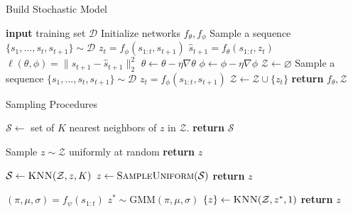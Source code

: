 \documentclass{article}
\begin{document}
\begin{minipage}[t]{7cm}
  \vspace{0pt}

  \begin{algorithm}[H]
    \caption{Build Stochastic Model}
  \begin{algorithmic}[1]
    \State \textbf{input} training set $\mathcal{D}$
    \State Initialize networks $f_\theta, f_\phi$
    \State Sample a sequence $\{s_1, ..., s_t, s_{t+1}\} \sim \mathcal{D}$
    \State $z_t = f_{\phi}(s_{1:t}, s_{t+1})$
    \State $\hat{s}_{t+1} = f_{\theta}(s_{1:t}, z_t)$
    \State $\ell(\theta, \phi) = \|s_{t+1} - \hat{s}_{t+1} \|_2^2$
    \State $\theta \leftarrow \theta - \eta \nabla \theta$
    \State $\phi \leftarrow \phi - \eta \nabla \phi$
    \EndWhile
    \State $\mathcal{Z} \leftarrow \varnothing$
    \State Sample a sequence $\{s_1, ..., s_t, s_{t+1}\} \sim \mathcal{D}$
    \State $z_t = f_{\phi}(s_{1:t}, s_{t+1})$
    \State $\mathcal{Z} \leftarrow \mathcal{Z} \cup \{ z_t \}$
    \EndFor
    \State \textbf{return} $f_\theta, \mathcal{Z}$
  \end{algorithmic}
  \end{algorithm}
\end{minipage}%
\begin{minipage}[t]{7cm}
  \vspace{0pt}

\begin{algorithm}[H]
  \caption{Sampling Procedures}\label{algo-sample}
  \begin{algorithmic}[1]
    \State $\mathcal{S} \gets $ set of $K$ nearest neighbors of $z$ in $\mathcal{Z}$.
    \State \textbf{return} $\mathcal{S}$
    \EndProcedure

    \State Sample $z \sim \mathcal{Z}$ uniformly at random
    \State \textbf{return} $z$
    \EndProcedure

    \State $\mathcal{S} \gets \textsc{KNN}(\mathcal{Z}, z, K)$
    \State $z \gets \textsc{SampleUniform}(\mathcal{S})$
    \State \textbf{return} $z$
    \EndProcedure

    \State $(\pi, \mu, \sigma) = f_\psi(s_{1:t})$
    \State $z^* \sim \mbox{GMM}(\pi, \mu, \sigma)$
    \State $\{z\} \gets \textsc{KNN}(\mathcal{Z}, z^*, 1)$
    \State \textbf{return} $z$
    \EndProcedure
  \end{algorithmic}
\vspace{5pt}
\end{algorithm}
\end{minipage}
\end{document}

